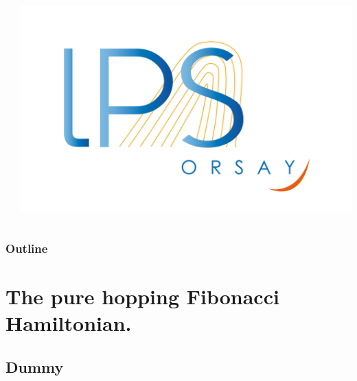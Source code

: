 \documentclass[xcolor=x11names,compress,professionalfonts]{beamer}
\renewcommand{\(}{\begin{columns}}
\renewcommand{\)}{\end{columns}}
\newcommand{\<}[1]{\begin{column}{#1}}
\renewcommand{\>}{\end{column}}
\begin{document}
\begin{frame}
\begin{columns}
\begin{column}{6cm}
\end{column}
\begin{column}{2cm}
~\\
~\\
~\\
~\\
\raggedleft
\includegraphics[scale=.15]{logo-lps.jpg}
\end{column}
\end{columns}
\end{frame}

\begin{frame}
\frametitle{Outline}
\tableofcontents[hideallsubsections]
\end{frame}

\section{The pure hopping Fibonacci Hamiltonian.}
\subsection{Dummy}
\end{document}

